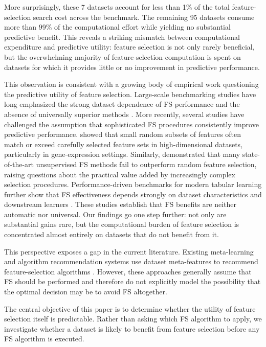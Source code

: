 \documentclass[preprint,12pt,authoryear]{elsarticle}
\begin{document}
More surprisingly, these 7 datasets account for less than 1\% of the total feature-selection search cost across the benchmark. The remaining 95 datasets consume more than 99\% of the computational effort while yielding no substantial predictive benefit. This reveals a striking mismatch between computational expenditure and predictive utility: feature selection is not only rarely beneficial, but the overwhelming majority of feature-selection computation is spent on datasets for which it provides little or no improvement in predictive performance.

This observation is consistent with a growing body of empirical work questioning the predictive utility of feature selection. Large-scale benchmarking studies have long emphasized the strong dataset dependence of FS performance and the absence of universally superior methods \citep{bommert2020benchmark,bommert2022benchmark}. More recently, several studies have challenged the assumption that sophisticated FS procedures consistently improve predictive performance. \cite{chen2026insignificance} showed that small random subsets of features often match or exceed carefully selected feature sets in high-dimensional datasets, particularly in gene-expression settings. Similarly, \cite{rajabinasab2026worse} demonstrated that many state-of-the-art unsupervised FS methods fail to outperform random feature selection, raising questions about the practical value added by increasingly complex selection procedures. Performance-driven benchmarks for modern tabular learning further show that FS effectiveness depends strongly on dataset characteristics and downstream learners \citep{cherepanova2023performance}. These studies establish that FS benefits are neither automatic nor universal. Our findings go one step further: not only are substantial gains rare, but the computational burden of feature selection is concentrated almost entirely on datasets that do not benefit from it.

This perspective exposes a gap in the current literature. Existing meta-learning and algorithm recommendation systems use dataset meta-features to recommend feature-selection algorithms \citep{parmezan2017metalearning,filchenkov2015datasets,shilbayeh2014feature}. However, these approaches generally assume that FS should be performed and therefore do not explicitly model the possibility that the optimal decision may be to avoid FS altogether.

The central objective of this paper is to determine whether the utility of feature selection itself is predictable. Rather than asking which FS algorithm to apply, we investigate whether a dataset is likely to benefit from feature selection before any FS algorithm is executed.
\end{document}
